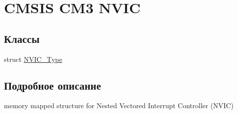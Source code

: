 \hypertarget{group___c_m_s_i_s___c_m3___n_v_i_c}{}\section{C\+M\+S\+IS C\+M3 N\+V\+IC}
\label{group___c_m_s_i_s___c_m3___n_v_i_c}
\subsection*{Классы}
\begin{DoxyCompactItemize}
\item 
struct \mbox{\hyperlink{struct_n_v_i_c___type}{N\+V\+I\+C\+\_\+\+Type}}
\end{DoxyCompactItemize}


\subsection{Подробное описание}
memory mapped structure for Nested Vectored Interrupt Controller (N\+V\+IC) 